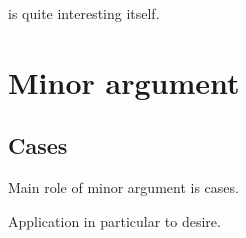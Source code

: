 \begin{note}
  \mcB{} is quite interesting itself.
\end{note}

\section{Minor argument}
\label{sec:posit-argumn-overv}

\subsection{Cases}
\label{sec:cases}

\begin{note}
  Main role of minor argument is cases.
\end{note}

\begin{note}
  Application in particular to desire.
\end{note}


